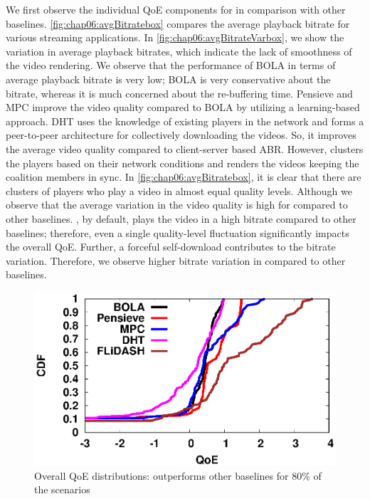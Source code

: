 We first observe the individual \ac{QoE} components for {\our} in comparison with other baselines. \fig\ref{fig:chap06:avgBitratebox} compares the average playback bitrate for various streaming applications. In \fig\ref{fig:chap06:avgBitrateVarbox}, we show the variation in average playback bitrates, which indicate the lack of smoothness of the video rendering. We observe that the performance of BOLA in terms of average playback bitrate is very low; BOLA is very conservative about the bitrate, whereas it is much concerned about the re-buffering time. Pensieve and MPC improve the video quality compared to BOLA by utilizing a learning-based approach. DHT uses the knowledge of existing players in the network and forms a peer-to-peer architecture for collectively downloading the videos. So, it improves the average video quality compared to client-server based \ac{ABR}. However, {\our} clusters the players based on their network conditions and renders the videos keeping the coalition members in sync. In \fig\ref{fig:chap06:avgBitratebox}, it is clear that there are clusters of players who play a video in almost equal quality levels. Although we observe that the average variation in the video quality is high for {\our} compared to other baselines. {\our}, by default, plays the video in a high bitrate compared to other baselines; therefore, even a single quality-level fluctuation significantly impacts the overall \ac{QoE}. Further, a forceful self-download contributes to the bitrate variation. Therefore, we observe higher bitrate variation in {\our} compared to other baselines.  
\begin{figure}[!ht]
	\begin{center}
       			\includegraphics[width=0.7\linewidth]{img/grpbasic/qoe_cdf_1}
	\end{center}
	\caption{\label{fig:chap06:QoE} Overall QoE distributions: {\our} outperforms other baselines for $80\%$ of the scenarios}
\end{figure}


